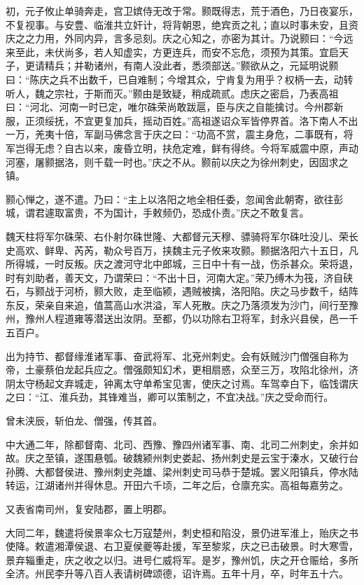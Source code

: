 \documentclass[12pt,UTF8]{ctexbook}
\begin{document}
初，元子攸止单骑奔走，宫卫嫔侍无改于常。颢既得志，荒于酒色，乃日夜宴乐，不复视事。与安豊、临淮共立奸计，将背朝恩，绝宾贡之礼；直以时事未安，且资庆之之力用，外同内异，言多忌刻。庆之心知之，亦密为其计。乃说颢曰：“今远来至此，未伏尚多，若人知虚实，方更连兵，而安不忘危，须预为其策。宜启天子，更请精兵；并勒诸州，有南人没此者，悉须部送。”颢欲从之，元延明说颢曰：“陈庆之兵不出数千，已自难制；今增其众，宁肯复为用乎？权柄一去，动转听人，魏之宗社，于斯而灭。”颢由是致疑，稍成疏贰。虑庆之密启，乃表高祖曰：“河北、河南一时已定，唯尔硃荣尚敢跋扈，臣与庆之自能擒讨。今州郡新服，正须绥抚，不宜更复加兵，摇动百姓。”高祖遂诏众军皆停界首。洛下南人不出一万，羌夷十倍，军副马佛念言于庆之曰：“功高不赏，震主身危，二事既有，将军岂得无虑？自古以来，废昏立明，扶危定难，鲜有得终。今将军威震中原，声动河塞，屠颢据洛，则千载一时也。”庆之不从。颢前以庆之为徐州刺史，因固求之镇。

颢心惮之，遂不遣。乃曰：“主上以洛阳之地全相任委，忽闻舍此朝寄，欲往彭城，谓君遽取富贵，不为国计，手敕频仍，恐成仆责。”庆之不敢复言。

魏天柱将军尔硃荣、右仆射尔硃世隆、大都督元天穆、骠骑将军尔硃吐没儿、荣长史高欢、鲜卑、芮芮，勒众号百万，挟魏主元子攸来攻颢。颢据洛阳六十五日，凡所得城，一时反叛。庆之渡河守北中郎城，三日中十有一战，伤杀甚众。荣将退，时有刘助者，善天文，乃谓荣曰：“不出十日，河南大定。”荣乃缚木为筏，济自硖石，与颢战于河桥，颢大败，走至临颍，遇贼被擒，洛阳陷。庆之马步数千，结阵东反，荣亲自来追，值蒿高山水洪溢，军人死散。庆之乃落须发为沙门，间行至豫州，豫州人程道雍等潜送出汝阴。至都，仍以功除右卫将军，封永兴县侯，邑一千五百户。

出为持节、都督缘淮诸军事、奋武将军、北兗州刺史。会有妖贼沙门僧强自称为帝，土豪蔡伯龙起兵应之。僧强颇知幻术，更相扇惑，众至三万，攻陷北徐州，济阴太守杨起文弃城走，钟离太守单希宝见害，使庆之讨焉。车驾幸白下，临饯谓庆之曰：“江、淮兵劲，其锋难当，卿可以策制之，不宜决战。”庆之受命而行。

曾未浃辰，斩伯龙、僧强，传其首。

中大通二年，除都督南、北司、西豫、豫四州诸军事、南、北司二州刺史，余并如故。庆之至镇，遂围悬瓠。破魏颍州刺史娄起、扬州刺史是云宝于溱水，又破行台孙腾、大都督侯进、豫州刺史尧雄、梁州刺史司马恭于楚城。罢义阳镇兵，停水陆转运，江湖诸州并得休息。开田六千顷，二年之后，仓廪充实。高祖每嘉劳之。

又表省南司州，复安陆郡，置上明郡。

大同二年，魏遣将侯景率众七万寇楚州，刺史桓和陷没，景仍进军淮上，贻庆之书使降。敕遣湘潭侯退、右卫夏侯夔等赴援，军至黎浆，庆之已击破景。时大寒雪，景弃辎重走，庆之收之以归。进号仁威将军。是岁，豫州饥，庆之开仓赈给，多所全济。州民李升等八百人表请树碑颂德，诏许焉。五年十月，卒，时年五十六。
\end{document}
